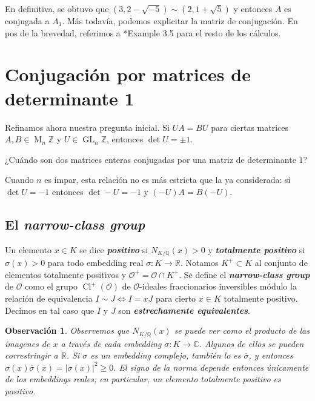 \documentclass[11pt,a4paper]{amsart}
\newcommand{\C}{\mathbb{C}}
\newcommand{\R}{\mathbb{R}}
\newcommand{\Q}{\mathbb{Q}}
\newcommand{\Z}{\mathbb{Z}}
\renewcommand{\emph}[1]{\textbf{\textit{#1}}}
\DeclareMathOperator{\Cl}{Cl}
\DeclareMathOperator{\M}{M}
\DeclareMathOperator{\GL}{GL}
\numberwithin{equation}{section}
\theoremstyle{plain}
\newtheorem{obs}[equation]{Observación}
\renewcommand{\O}{\mathcal{O}}
\begin{document}
En definitiva, se obtuvo que $(3,2-\sqrt{-5}) \sim (2,1+\sqrt{5})$
y entonces $A$ es conjugada a $A_1$. Más todavía, podemos
explicitar la matriz de conjugación. En pos de la brevedad,
referimos a \cite{KCd}*{Example 3.5} para el resto de los cálculos.

\section{Conjugación por matrices de determinante 1}

Refinamos ahora nuestra pregunta inicial. Si $UA = BU$
para ciertas matrices $A,B \in \M_n \Z$ y $U \in \GL_n \Z$,
entonces $\det U = \pm 1$.

¿Cuándo son dos matrices enteras
conjugadas por una matriz de determinante $1$?

Cuando $n$ es impar, esta relación no es más estricta que la ya
considerada: si $\det U = -1$ entonces $\det -U = -1$ y $(-U)A = B(-U)$.

\subsection{El \emph{narrow-class group}}

Un elemento $x \in K$ se dice \emph{positivo}
si $N_{K/\Q}(x) > 0$ y \emph{totalmente positivo}
si $\sigma(x) > 0$
para todo embedding real $\sigma \colon K \to \R$.
Notamos $K^+ \subset K$
al conjunto de elementos totalmente positivos y
$\O^+ = \O \cap K^+$.
Se define el \emph{narrow-class group} de $\O$ como
el grupo $\Cl^+(\O)$ de $\O$-ideales fraccionarios inversibles
módulo la relación de
equivalencia $I \sim J \iff I = xJ$ para cierto $x \in K$ totalmente
positivo. Decimos en tal caso que $I$ y $J$ son
\emph{estrechamente equivalentes}.

\begin{obs} Observemos que $N_{K/\Q}(x)$ se puede ver como el
producto de las imagenes de $x$ a través de cada
\textit{embedding} $\sigma \colon K \to \C$. Algunos de ellos
se pueden correstringir a $\R$. Si $\sigma$ es un embedding complejo,
también lo es $\overline \sigma$, y entonces
$\sigma(x)\overline\sigma(x) = |\sigma(x)|^2 \ge 0$. El signo
de la norma depende entonces únicamente de los embeddings reales; en
particular, un elemento totalmente positivo es positivo.
\end{obs}
\end{document}
